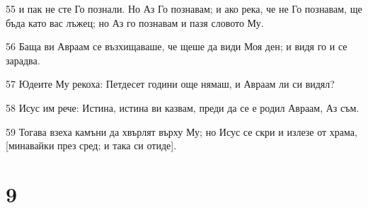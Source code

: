 \par 55 и пак не сте Го познали. Но Аз Го познавам; и ако река, че не Го познавам, ще бъда като вас лъжец; но Аз го познавам и пазя словото Му.
\par 56 Баща ви Авраам се възхищаваше, че щеше да види Моя ден; и видя го и се зарадва.
\par 57 Юдеите Му рекоха: Петдесет години още нямаш, и Авраам ли си видял?
\par 58 Исус им рече: Истина, истина ви казвам, преди да се е родил Авраам, Аз съм.
\par 59 Тогава взеха камъни да хвърлят върху Му; но Исус се скри и излезе от храма, [минавайки през сред; и така си отиде].

\chapter{9}

